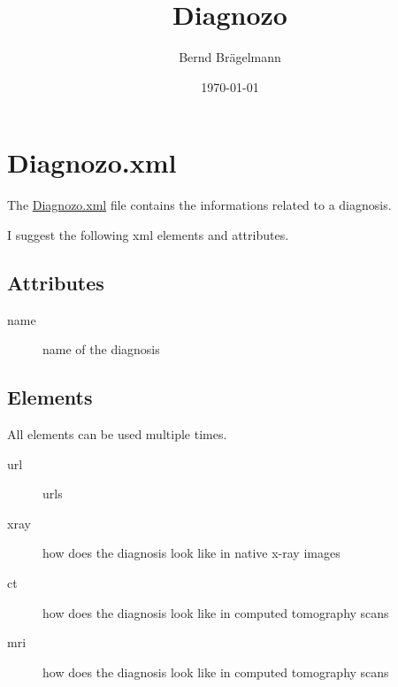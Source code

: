 \documentclass{article}
\title{Diagnozo}
\author{Bernd Brägelmann}
\date{\today}
\begin{document}
\maketitle
\tableofcontents

\section{Diagnozo.xml}
The \href{https://github.com/braegel/Diagnozo/blob/master/data/diagnozo.xml}{Diagnozo.xml} file contains the informations related to a diagnosis.

I suggest the following xml elements and attributes.

\subsection{Attributes}

\begin{description}
	\item[name] name of the diagnosis
\end{description}

\subsection{Elements}
All elements can be used multiple times.

\begin{description}
	\item[url] urls
	\item[xray] how does the diagnosis look like in native x-ray images
	\item[ct] how does the diagnosis look like in computed tomography scans
	\item[mri] how does the diagnosis look like in computed tomography scans
\end{description}
\end{document}
